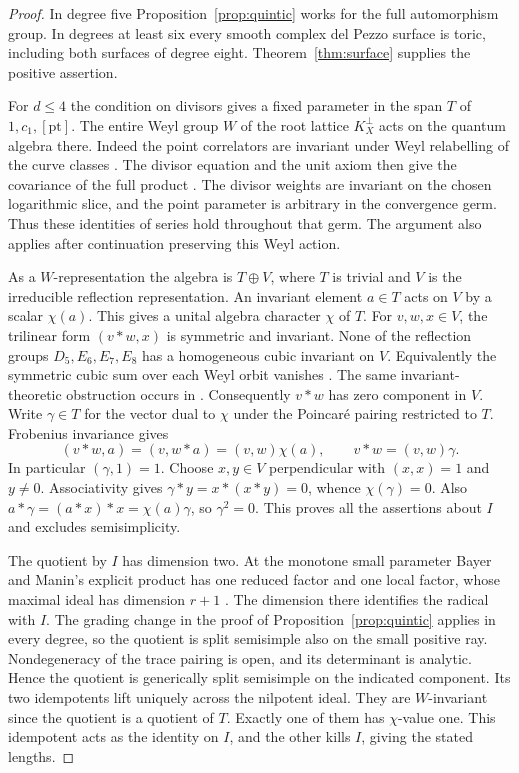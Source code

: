 \begin{proof}
In degree five Proposition~\ref{prop:quintic} works for the full automorphism group. In degrees at least six every smooth complex del Pezzo surface is toric, including both surfaces of degree eight. Theorem~\ref{thm:surface} supplies the positive assertion.

For $d\le4$ the condition on divisors gives a fixed parameter in the span $T$ of $1,c_1,[\mathrm{pt}]$. The entire Weyl group $W$ of the root lattice $K_X^\perp$ acts on the quantum algebra there. Indeed the point correlators are invariant under Weyl relabelling of the curve classes \cite[\S5.1]{GP}. The divisor equation and the unit axiom then give the covariance of the full product \cite[(3.1)--(3.3) and \S3.3]{BM}. The divisor weights are invariant on the chosen logarithmic slice, and the point parameter is arbitrary in the convergence germ. Thus these identities of series hold throughout that germ. The argument also applies after continuation preserving this Weyl action.

As a $W$-representation the algebra is $T\oplus V$, where $T$ is trivial and $V$ is the irreducible reflection representation. An invariant element $a\in T$ acts on $V$ by a scalar $\chi(a)$. This gives a unital algebra character $\chi$ of $T$. For $v,w,x\in V$, the trilinear form $(v*w,x)$ is symmetric and invariant. None of the reflection groups $D_5,E_6,E_7,E_8$ has a homogeneous cubic invariant on $V$. Equivalently the symmetric cubic sum over each Weyl orbit vanishes \cite[Lemma~3.5.2]{BM}. The same invariant-theoretic obstruction occurs in \cite{ADE}. Consequently $v*w$ has zero component in $V$. Write $\gamma\in T$ for the vector dual to $\chi$ under the Poincar\'e pairing restricted to $T$. Frobenius invariance gives
\[
                (v*w,a)=(v,w*a)=(v,w)\chi(a),
              \qquad v*w=(v,w)\gamma .
\]
In particular $(\gamma,1)=1$. Choose $x,y\in V$ perpendicular with $(x,x)=1$ and $y\ne0$. Associativity gives $\gamma*y=x*(x*y)=0$, whence $\chi(\gamma)=0$. Also $a*\gamma=(a*x)*x=\chi(a)\gamma$, so $\gamma^2=0$. This proves all the assertions about $I$ and excludes semisimplicity.

The quotient by $I$ has dimension two. At the monotone small parameter Bayer and Manin's explicit product has one reduced factor and one local factor, whose maximal ideal has dimension $r+1$ \cite[Proposition~3.5.5]{BM}. The dimension there identifies the radical with $I$. The grading change in the proof of Proposition~\ref{prop:quintic} applies in every degree, so the quotient is split semisimple also on the small positive ray. Nondegeneracy of the trace pairing is open, and its determinant is analytic. Hence the quotient is generically split semisimple on the indicated component. Its two idempotents lift uniquely across the nilpotent ideal. They are $W$-invariant since the quotient is a quotient of $T$. Exactly one of them has $\chi$-value one. This idempotent acts as the identity on $I$, and the other kills $I$, giving the stated lengths.
\end{proof}

